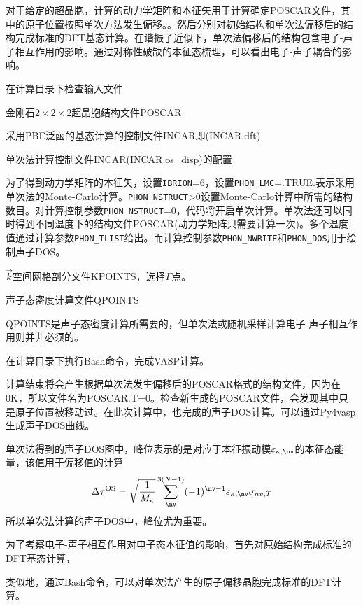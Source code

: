 对于给定的超晶胞，计算的动力学矩阵和本征矢用于计算确定\textrm{POSCAR}文件，其中的原子位置按照单次方法发生偏移。。然后分别对初始结构和单次法偏移后的结构完成标准的\textrm{DFT}基态计算。在谐振子近似下，单次法偏移后的结构包含电子-声子相互作用的影响。通过对称性破缺的本征态梳理，可以看出电子-声子耦合的影响。

在计算目录下检查输入文件

金刚石$2\times2\times2$超晶胞结构文件\textrm{POSCAR}

采用\textrm{PBE}泛函的基态计算的控制文件\textrm{INCAR}即\textrm{(INCAR.dft)}

单次法计算控制文件\textrm{INCAR}\textrm{(INCAR.os\_disp)}的配置

为了得到动力学矩阵的本征矢，设置\texttt{IBRION}=6，设置\texttt{PHON\_LMC}=\textrm{.TRUE.}表示采用单次法的\textrm{Monte-Carlo}计算。\texttt{PHON\_NSTRUCT}>0设置\textrm{Monte-Carlo}计算中所需的结构数目。对计算控制参数\texttt{PHON\_NSTRUCT}=0，代码将开启单次计算。单次法还可以同时得到不同温度下的结构文件\textrm{POSCAR}(动力学矩阵只需要计算一次)。多个温度值通过计算参数\texttt{PHON\_TLIST}给出。而计算控制参数\texttt{PHON\_NWRITE}和\texttt{PHON\_DOS}用于绘制声子\textrm{DOS}。

$\vec k$空间网格剖分文件\textrm{KPOINTS}，选择$\Gamma$点。

声子态密度计算文件\textrm{QPOINTS}

\textrm{QPOINTS}是声子态密度计算所需要的，但单次法或随机采样计算电子-声子相互作用则并非必须的。

在计算目录下执行\textrm{Bash}命令，完成\textrm{VASP}计算。

计算结束将会产生根据单次法发生偏移后的\textrm{POSCAR}格式的结构文件，因为在\textrm{0K}，所以文件名为\textrm{POSCAR.T=0}。检查新生成的\textrm{POSCAR}文件，会发现其中只是原子位置被移动过。在此次计算中，也完成的声子\textrm{DOS}计算。可以通过\textrm{Py4vasp}生成声子\textrm{DOS}曲线。

单次法得到的声子\textrm{DOS}图中，峰位表示的是对应于本征振动模$\varepsilon_{\kappa,\nv}$的本征态能量，该值用于偏移值的计算
\begin{displaymath}
	\Delta\tau^{\mathrm{OS}}=\sqrt{\frac1{M_{\kappa}}}\sum_{\nv}^{3(N-1)}(-1)^{\nv-1}\varepsilon_{\kappa,\nv}\sigma_{nv,T}
\end{displaymath}
所以单次法计算的声子\textrm{DOS}中，峰位尤为重要。

为了考察电子-声子相互作用对电子态本征值的影响，首先对原始结构完成标准的\textrm{DFT}基态计算，

类似地，通过\textrm{Bash}命令，可以对单次法产生的原子偏移晶胞完成标准的\textrm{DFT}计算。

